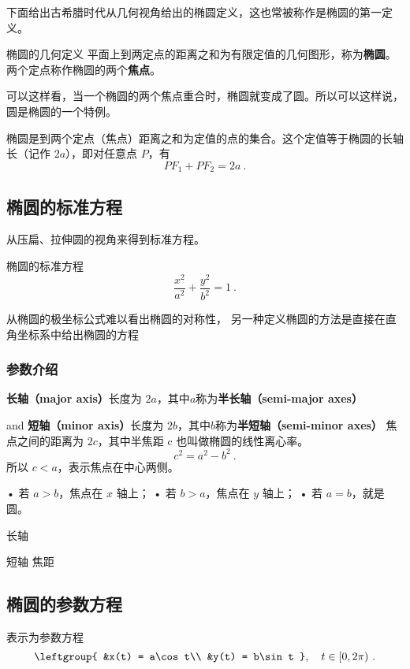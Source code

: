 下面给出古希腊时代从几何视角给出的椭圆定义，这也常被称作是椭圆的第一定义。

\begin{definition}{椭圆的几何定义}
平面上到两定点的距离之和为有限定值的几何图形，称为\textbf{椭圆}。两个定点称作椭圆的两个\textbf{焦点}。
\end{definition}

可以这样看，当一个椭圆的两个焦点重合时，椭圆就变成了圆。所以可以这样说，圆是椭圆的一个特例。

椭圆是到两个定点（焦点）距离之和为定值的点的集合。这个定值等于椭圆的长轴长（记作 $2a$），即对任意点 $P$，有
\begin{equation}\label{eq_Elips3_9}
PF_1 + PF_2 = 2a ~.
\end{equation}



\subsection{椭圆的标准方程}

从压扁、拉伸圆的视角来得到标准方程。

\begin{definition}{椭圆的标准方程}
\begin{equation}\label{eq_Elips3_3}
\frac{x^2}{a^2} + \frac{y^2}{b^2} = 1~.
\end{equation}
\end{definition}

从椭圆的极坐标公式难以看出椭圆的对称性， 另一种定义椭圆的方法是直接在直角坐标系中给出椭圆的方程

\subsubsection{参数介绍}

\textbf{长轴（major axis）}长度为 $2a$，其中$a$称为\textbf{半长轴（semi-major axes）}

and 
\textbf{短轴（minor axis）}长度为 $2b$，其中$b$称为\textbf{半短轴（semi-minor axes）}
焦点之间的距离为 $2c$，其中半焦距 c 也叫做椭圆的线性离心率。
$$ c^2 = a^2 - b^2~. $$
所以 $c < a$，表示焦点在中心两侧。

	•	若 $a > b$，焦点在 $x$ 轴上；
	•	若 $b > a$，焦点在 $y$ 轴上；
	•	若 $a = b$，就是圆。


长轴

短轴
焦距

\subsection{椭圆的参数方程}
表示为参数方程
\begin{equation}\label{eq_Elips3_1}
\leftgroup{
&x(t) = a\cos t\\
&y(t) = b\sin t
},\quad t \in [0, 2\pi) ~.
\end{equation}
